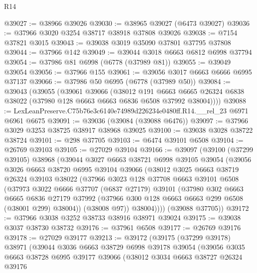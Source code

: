 \begin{lexlean}{R14}
\begin{coremodule}
@39027 := @38966 @39026
@39030 := @38965 @39027 (@6473 @39027)
@39036 := @37966 @3020 @3254 @38717 @38918 @37808 @39026
@39038 := @7154 @37821 @3015
@39043 := @39038 @3019 @35090 @37801 @37795 @37808
@39044 := @37966 @142
@39049 := @39044 @3018 @6663 @6812 @6998 @37794
@39054 := @37986 @81 @6998 (@6778 (@37989 @81))
@39055 := @39049 @39054
@39056 := @37966 @155
@39061 := @39056 @3017 @6663 @6666 @6995 @37137
@39066 := @37986 @50 @6995 (@6778 (@37989 @50))
@39084 := @39043
    (@39055
      (@39061
        @39066
        (@38012
          @191
          @6663
          @6665
          @26324
          @6838
          @38022
          (@37980 @128 @6663 @6663 @6836 @6508 @37992 @38004))))
@39088 := LexLeanPreserve.C75b76e3c6140e74989d226234e0480ff.R14.__rel_23 @6971 @6961 @6675
@39091 := @39036 (@39084 (@39088 @6476))
@39097 := @37966 @3029 @3253 @38725 @38917 @38968 @39025
@39100 := @39038 @3028 @38722 @38724
@39101 := @298 @37705
@39103 := @6474 @39101 @6508
@39104 := @26769 @39103
@39105 := @27029 @39104
@39166 := @39097
    (@39100
      (@37299 @39105)
      @38968
      (@39044
        @3027
        @6663
        @38721
        @6998
        @39105
        @39054
        (@39056
          @3026
          @6663
          @38720
          @6995
          @39104
          @39066
          (@38012
            @3025
            @6663
            @38719
            @26324
            @39103
            @38022
            (@37966
              @3023
              @128
              @37708
              @6663
              @39101
              @6508
              (@37973
                @3022
                @6666
                @37707
                (@6837 @27179)
                @39101
                (@37980
                  @302
                  @6663
                  @6665
                  @6836
                  @27179
                  @37992
                  (@37966 @300 @128 @6663 @6663 @299 @6508 (@38001 @299) @38004))
                (@38008 @97))
              @38004))))
      (@39088 @37705))
@39172 := @37966 @3038 @3252 @38733 @38916 @38971 @39024
@39175 := @39038 @3037 @38730 @38732
@39176 := @37961 @6508
@39177 := @26769 @39176
@39178 := @27029 @39177
@39213 := @39172
    (@39175
      (@37299 @39178)
      @38971
      (@39044
        @3036
        @6663
        @38729
        @6998
        @39178
        @39054
        (@39056
          @3035
          @6663
          @38728
          @6995
          @39177
          @39066
          (@38012
            @3034
            @6663
            @38727
            @26324
            @39176

\end{coremodule}
\end{lexlean}
